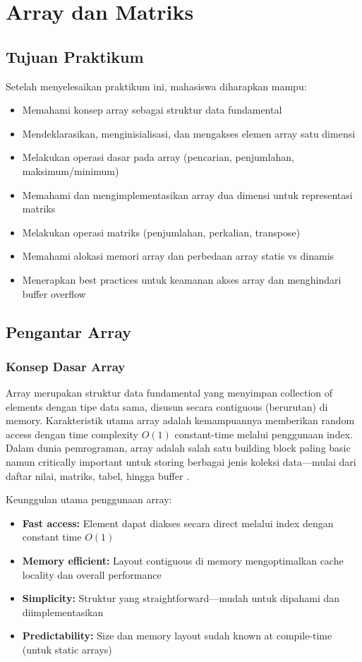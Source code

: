 \documentclass[../main.tex]{subfiles}
\begin{document}
\chapter{Array dan Matriks}

\section*{Tujuan Praktikum}
Setelah menyelesaikan praktikum ini, mahasiswa diharapkan mampu:
\begin{itemize}
  \item Memahami konsep array sebagai struktur data fundamental
  \item Mendeklarasikan, menginisialisasi, dan mengakses elemen array satu dimensi
  \item Melakukan operasi dasar pada array (pencarian, penjumlahan, maksimum/minimum)
  \item Memahami dan mengimplementasikan array dua dimensi untuk representasi matriks
  \item Melakukan operasi matriks (penjumlahan, perkalian, transpose)
  \item Memahami alokasi memori array dan perbedaan array statis vs dinamis
  \item Menerapkan best practices untuk keamanan akses array dan menghindari buffer overflow
\end{itemize}

\section{Pengantar Array}

\subsection{Konsep Dasar Array}
Array merupakan struktur data fundamental yang menyimpan collection of elements dengan tipe data sama, disusun secara contiguous (berurutan) di memory. Karakteristik utama array adalah kemampuannya memberikan random access dengan time complexity \(O(1)\) constant-time melalui penggunaan index. Dalam dunia pemrograman, array adalah salah satu building block paling basic namun critically important untuk storing berbagai jenis koleksi data—mulai dari daftar nilai, matriks, tabel, hingga buffer \parencite{cpp-reference,free-pascal-docs,iso-c-draft-n1570,tutorialspoint-c-arrays}.

Keunggulan utama penggunaan array:
\begin{itemize}
  \item \textbf{Fast access:} Element dapat diakses secara direct melalui index dengan constant time \(O(1)\)
  \item \textbf{Memory efficient:} Layout contiguous di memory mengoptimalkan cache locality dan overall performance
  \item \textbf{Simplicity:} Struktur yang straightforward—mudah untuk dipahami dan diimplementasikan
  \item \textbf{Predictability:} Size dan memory layout sudah known at compile-time (untuk static arrays)
\end{itemize}
\end{document}
